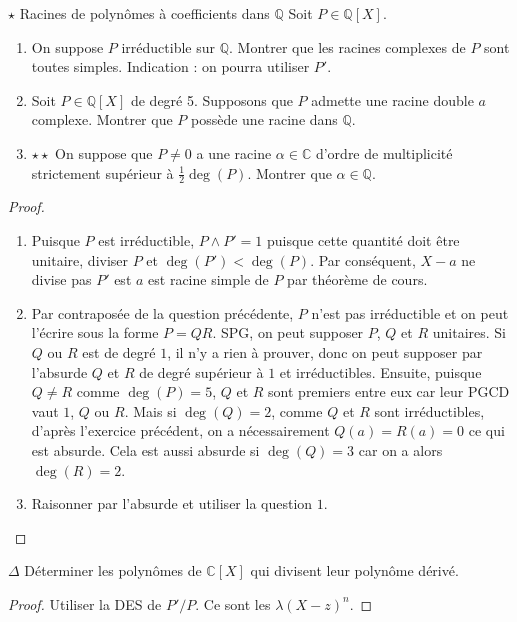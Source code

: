 \documentclass[french,a4paper]{article}
\newcommand{\Q}{\mathbb{Q}}
\newcommand{\C}{\mathbb{C}}
\theoremstyle{plain}
\theoremstyle{definition}
\theoremstyle{remark}
\begin{document}
\begin{ex}[Moulin.AG.65]{$\star$ Racines de polynômes à coefficients dans $\Q$}
	Soit $P\in\Q[X]$.
	\begin{enumerate}
		\item On suppose $P$ irréductible sur $\Q$. Montrer que les racines complexes de $P$ sont toutes simples. Indication : on pourra utiliser $P'$.
		\item Soit $P\in\Q[X]$ de degré 5. Supposons que $P$ admette une racine double $a$ complexe. Montrer que $P$ possède une racine dans $\Q$.
		\item $\star\star$ On suppose que $P\ne 0$ a une racine $\alpha\in\C$ d'ordre de multiplicité strictement supérieur à $\displaystyle\frac12\deg(P)$. Montrer que $\alpha\in\Q$.
	\end{enumerate}
\end{ex}
\begin{proof}
	\begin{enumerate}
		\item Puisque $P$ est irréductible, $P\wedge P'=1$ puisque cette quantité doit être unitaire, diviser $P$ et $\deg(P')<\deg(P)$. Par conséquent, $X-a$ ne divise pas $P'$ est $a$ est racine simple de $P$ par théorème de cours.
		\item Par contraposée de la question précédente, $P$ n'est pas irréductible et on peut l'écrire sous la forme $P=QR$. SPG, on peut supposer $P$, $Q$ et $R$ unitaires. Si $Q$ ou $R$ est de degré $1$, il n'y a rien à prouver, donc on peut supposer par l'absurde $Q$ et $R$ de degré supérieur à $1$ et irréductibles. Ensuite, puisque $Q\ne R$ comme $\deg(P)=5$, $Q$ et $R$ sont premiers entre eux car leur PGCD vaut $1$, $Q$ ou $R$. Mais si $\deg(Q)=2$, comme $Q$ et $R$ sont irréductibles, d'après l'exercice précédent, on a nécessairement $Q(a)=R(a)=0$ ce qui est absurde. Cela est aussi absurde si $\deg(Q)=3$ car on a alors $\deg(R)=2$.
		\item Raisonner par l'absurde et utiliser la question $1$.
	\end{enumerate}
\end{proof}

\begin{ex}[Moulin.AG.66]{$\Delta$}
	Déterminer les polynômes de $\C[X]$ qui divisent leur polynôme dérivé.
\end{ex}
\begin{proof}
	Utiliser la DES de $P'/P$. Ce sont les $\lambda(X-z)^n$.
\end{proof}
\end{document}
